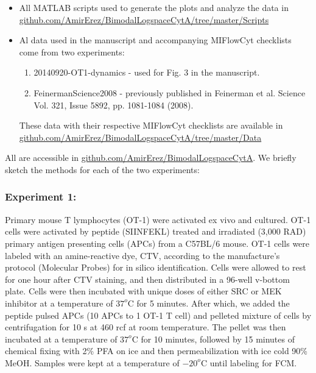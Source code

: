 \documentclass[11pt,a4paper,final]{article}
\begin{document}
\smallskip
\begin{itemize}
\item All MATLAB scripts used to generate the plots and analyze the data in {\small \href{https://github.com/AmirErez/BimodalLogspaceCytA/tree/master/Scripts}{github.com/AmirErez/BimodalLogspaceCytA/tree/master/Scripts}}
\item Al data used in the manuscript and accompanying MIFlowCyt checklists come from two experiments:
	\begin{enumerate}
	\item 20140920-OT1-dynamics - used for Fig. 3 in the manuscript.
	\item FeinermanScience2008 - previously published in Feinerman et al. Science Vol. 321, Issue 5892, pp. 1081-1084 (2008). 
	\end{enumerate}
These data with their respective MIFlowCyt checklists are available in {\small
\href{https://github.com/AmirErez/BimodalLogspaceCytA/tree/master/Data}{github.com/AmirErez/BimodalLogspaceCytA/tree/master/Data}}
\end{itemize} 
All are accessible in {\small\href{https://github.com/AmirErez/BimodalLogspaceCytA}{github.com/AmirErez/BimodalLogspaceCytA}}.
We briefly sketch the methods for each of the two experiments:
\subsubsection*{Experiment 1:} Primary mouse T lymphocytes (OT-1) were activated ex vivo and cultured. OT-1 cells were activated by peptide (SIINFEKL) treated and irradiated (3,000 RAD) primary antigen presenting cells (APCs) from a C57BL/6 mouse. OT-1 cells were labeled with an amine-reactive dye, CTV, according to the manufacture’s protocol (Molecular Probes) for in silico identification. Cells were allowed to rest for one hour after CTV staining, and then distributed in a 96-well v-bottom plate. Cells were then incubated with unique doses of either SRC or MEK inhibitor at a temperature of $37^o$C for 5 minutes. After which,  we added the peptide pulsed APCs (10 APCs to 1 OT-1 T cell) and pelleted mixture of cells by centrifugation for 10 s at 460 rcf at room temperature.  The pellet was then incubated at a temperature of $37^o$C for 10 minutes, followed by 15 minutes of chemical fixing with 2\% PFA on ice and then permeabilization with ice cold 90\% MeOH. Samples were kept at a temperature of $-20^o$C until labeling for FCM.
\end{document}
